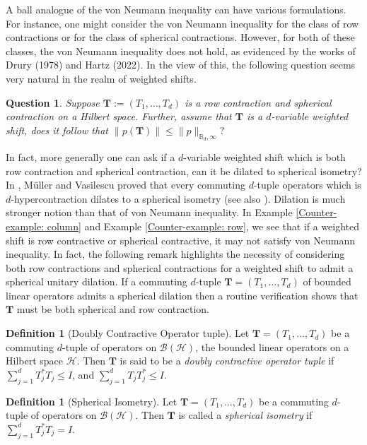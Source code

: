 \documentclass[12pt,reqno] {amsart}
\newtheorem{question}{Question}
\theoremstyle{remark}
\theoremstyle{definition}
\newtheorem{definition}[theorem]{Definition}%
\begin{document}
A ball analogue of the von Neumann inequality can have various formulations. For instance, one might consider the von Neumann inequality for the class of row contractions or for the class of spherical contractions. However, for both of these classes, the von Neumann inequality does not hold, as evidenced by the works of  Drury (1978)\cite{Drury1978} and Hartz (2022)\cite{Hartz2022}. 
In the view of this, the following question seems very natural in the realm of weighted shifts.
\begin{question}\label{On Ball}
    Suppose $\boldsymbol T:=(T_1,\ldots, T_d)$ is a row contraction and spherical contraction on a Hilbert space. Further, assume that $\boldsymbol T$ is a $d$-variable weighted shift, does it follow that $\|p(\boldsymbol T)\|\leqslant \|p\|_{\mathbb B_d,\infty}?$
\end{question}
In fact, more generally one can ask if a $d$-variable weighted shift which is both row contraction and spherical contraction, can it be dilated to spherical isometry? In \cite{M-V}, M\"uller and Vasilescu proved that every commuting $d$-tuple operators which is $d$-hypercontraction dilates to a spherical isometry (see also \cite{At-1}). 
Dilation is much stronger notion than that of von Neumann inequality.  
In Example \ref{Counter-example: column} and Example \ref{Counter-example: row}, we see that if a weighted shift is row contractive or spherical contractive, it may not satisfy von Neumann inequality. 
In fact, the following remark highlights the necessity of considering both row contractions and spherical contractions for a weighted shift to admit a spherical unitary dilation.
 If a commuting $d$-tuple $\boldsymbol T=(T_1,\ldots, T_d)$ of bounded linear operators admits a spherical dilation then a routine verification shows that $\boldsymbol T$ must be both spherical and row contraction. 
 
\begin{definition}[Doubly Contractive Operator tuple]
Let \( \boldsymbol T = (T_1, \dots, T_d) \) be a commuting \( d \)-tuple of operators on \( \mathcal{B}(\mathcal{H}) \), the bounded linear operators on a Hilbert space \( \mathcal{H} \). Then \( \boldsymbol T \) is said to be a \textit{doubly contractive operator tuple} if \( \sum_{j=1}^{d} T_j^* T_j \leq I \), and \( \sum_{j=1}^{d} T_j T_j^* \leq I \).
\end{definition}

\begin{definition}[Spherical Isometry]
Let \( \boldsymbol T = (T_1, \dots, T_d) \) be a commuting \( d \)-tuple of operators on \( \mathcal{B}(\mathcal{H}) \). Then \( \boldsymbol T \) is called a \textit{spherical isometry} if \( \sum_{j=1}^{d} T_j^* T_j = I \). 
\end{definition}
\end{document}
